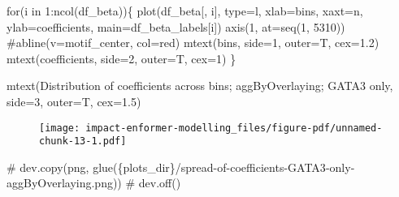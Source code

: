 \documentclass[
  letterpaper,
  DIV=11,
  numbers=noendperiod]{scrartcl}
\newenvironment{Shaded}{\begin{snugshade}}{\end{snugshade}}
\newcommand{\AttributeTok}[1]{\textcolor[rgb]{0.40,0.45,0.13}{#1}}
\newcommand{\CommentTok}[1]{\textcolor[rgb]{0.37,0.37,0.37}{#1}}
\newcommand{\ControlFlowTok}[1]{\textcolor[rgb]{0.00,0.23,0.31}{#1}}
\newcommand{\DecValTok}[1]{\textcolor[rgb]{0.68,0.00,0.00}{#1}}
\newcommand{\FloatTok}[1]{\textcolor[rgb]{0.68,0.00,0.00}{#1}}
\newcommand{\FunctionTok}[1]{\textcolor[rgb]{0.28,0.35,0.67}{#1}}
\newcommand{\NormalTok}[1]{\textcolor[rgb]{0.00,0.23,0.31}{#1}}
\newcommand{\SpecialCharTok}[1]{\textcolor[rgb]{0.37,0.37,0.37}{#1}}
\newcommand{\StringTok}[1]{\textcolor[rgb]{0.13,0.47,0.30}{#1}}
\begin{document}
\begin{Shaded}
\begin{Highlighting}[]
\ControlFlowTok{for}\NormalTok{(i }\ControlFlowTok{in} \DecValTok{1}\SpecialCharTok{:}\FunctionTok{ncol}\NormalTok{(df\_beta))\{}
    \FunctionTok{plot}\NormalTok{(df\_beta[, i], }\AttributeTok{type=}\StringTok{\textquotesingle{}l\textquotesingle{}}\NormalTok{, }\AttributeTok{xlab=}\StringTok{\textquotesingle{}bins\textquotesingle{}}\NormalTok{, }\AttributeTok{xaxt=}\StringTok{\textquotesingle{}n\textquotesingle{}}\NormalTok{, }\AttributeTok{ylab=}\StringTok{\textquotesingle{}coefficients\textquotesingle{}}\NormalTok{, }\AttributeTok{main=}\NormalTok{df\_beta\_labels[i])}
    \FunctionTok{axis}\NormalTok{(}\DecValTok{1}\NormalTok{, }\AttributeTok{at=}\FunctionTok{seq}\NormalTok{(}\DecValTok{1}\NormalTok{, }\DecValTok{5310}\NormalTok{))}
    \CommentTok{\#abline(v=motif\_center, col=\textquotesingle{}red\textquotesingle{})}
    \FunctionTok{mtext}\NormalTok{(}\StringTok{\textquotesingle{}bins\textquotesingle{}}\NormalTok{, }\AttributeTok{side=}\DecValTok{1}\NormalTok{, }\AttributeTok{outer=}\NormalTok{T, }\AttributeTok{cex=}\FloatTok{1.2}\NormalTok{)}
    \FunctionTok{mtext}\NormalTok{(}\StringTok{\textquotesingle{}coefficients\textquotesingle{}}\NormalTok{, }\AttributeTok{side=}\DecValTok{2}\NormalTok{, }\AttributeTok{outer=}\NormalTok{T, }\AttributeTok{cex=}\DecValTok{1}\NormalTok{)}
\NormalTok{\}}

\FunctionTok{mtext}\NormalTok{(}\StringTok{\textquotesingle{}Distribution of coefficients across bins; aggByOverlaying; GATA3 only\textquotesingle{}}\NormalTok{, }\AttributeTok{side=}\DecValTok{3}\NormalTok{, }\AttributeTok{outer=}\NormalTok{T, }\AttributeTok{cex=}\FloatTok{1.5}\NormalTok{)}
\end{Highlighting}
\end{Shaded}

\begin{figure}[H]

{\centering \texttt{[image: impact-enformer-modelling\_files/figure-pdf/unnamed-chunk-13-1.pdf]}

}

\end{figure}

\begin{Shaded}
\begin{Highlighting}[]
\CommentTok{\# dev.copy(png, glue(\textquotesingle{}\{plots\_dir\}/spread{-}of{-}coefficients{-}GATA3{-}only{-}aggByOverlaying.png\textquotesingle{}))}
\CommentTok{\# dev.off()}
\end{Highlighting}
\end{Shaded}
\end{document}
